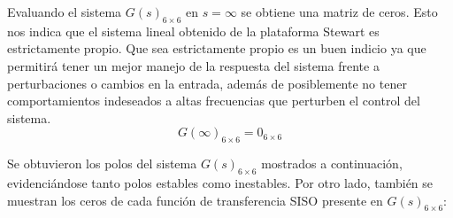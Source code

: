 Evaluando el sistema $G(s)_{6\times6}$ en $s=\infty$ se obtiene una matriz de ceros. Esto nos indica que el sistema lineal obtenido de la plataforma Stewart es estrictamente propio. Que sea estrictamente propio es un buen indicio ya que permitirá tener un mejor manejo de la respuesta del sistema frente a perturbaciones o cambios en la entrada, además de posiblemente no tener comportamientos indeseados a altas frecuencias que perturben el control del sistema.
\begin{equation}
    G(\infty)_{6\times6} = 0_{6\times6}
\end{equation}

Se obtuvieron los polos del sistema $G(s)_{6\times6}$ mostrados a continuación, evidenciándose tanto polos estables como inestables. Por otro lado, también se muestran los ceros de cada función de transferencia SISO presente en $G(s)_{6\times6}$:

